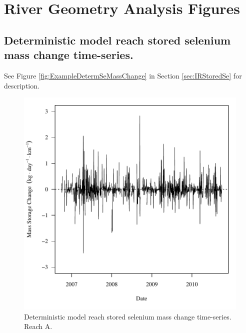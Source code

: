 \renewcommand{\thechapter}{D}
\chapter{River Geometry Analysis Figures}
\section{Deterministic model reach stored selenium mass change time-series.}
\label{App:SeS-D}

See Figure \ref{fig:ExampleDetermSeMassChange} in Section \ref{sec:IRStoredSe} for description.

\begin{figure}[htbp]
	\begin{center}
	\includegraphics[width=6in]{"Figures/Results_DUSR/f Segment A"}
	\caption{Deterministic model reach stored selenium mass change time-series.  Reach A.}
	\end{center}
\end{figure}
\newpage

